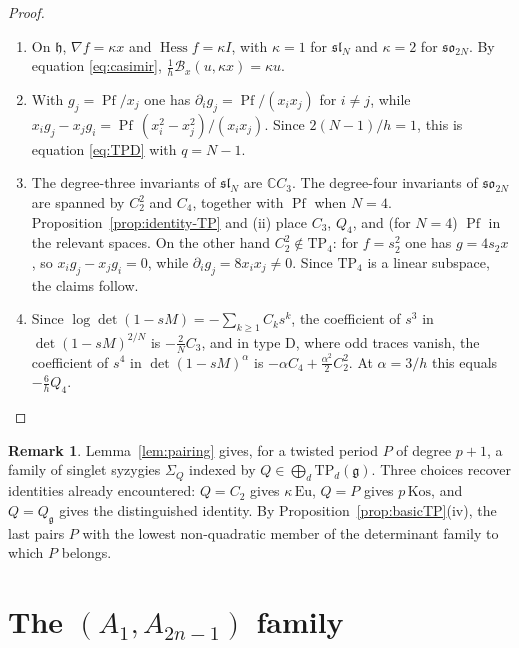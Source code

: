 \documentclass[10pt,reqno]{amsart}
\numberwithin{equation}{section}
\theoremstyle{plain}
\theoremstyle{definition}
\newtheorem{remark}[theorem]{Remark}
\DeclareMathOperator{\Pf}{Pf}
\DeclareMathOperator{\Hess}{Hess}
\newcommand{\Eu}{\mathrm{Eu}}
\newcommand{\Kos}{\mathrm{Kos}}
\newcommand{\TP}{\mathrm{TP}}
\begin{document}
\begin{proof}
\begin{enumerate}[label=(\roman*)]
	\item On $\mathfrak{h}$, $\nabla f=\kappa x$ and $\Hess f=\kappa I$, with $\kappa=1$ for $\mathfrak{sl}_N$ and $\kappa=2$ for $\mathfrak{so}_{2N}$. By equation \eqref{eq:casimir}, $\tfrac1h\mathcal{B}_x(u,\kappa x)=\kappa u$.
	\item With $g_j=\Pf/x_j$ one has $\partial_ig_j=\Pf/(x_ix_j)$ for $i\neq j$, while $x_ig_j-x_jg_i=\Pf\,(x_i^2-x_j^2)/(x_ix_j)$. Since $2(N-1)/h=1$, this is equation \eqref{eq:TPD} with $q=N-1$.
	\item The degree-three invariants of $\mathfrak{sl}_N$ are $\mathbb{C} C_3$. The degree-four invariants of $\mathfrak{so}_{2N}$ are spanned by $C_2^2$ and $C_4$, together with $\Pf$ when $N=4$. Proposition~\ref{prop:identity-TP} and (ii) place $C_3$, $Q_4$, and (for $N=4$) $\Pf$ in the relevant spaces. On the other hand $C_2^2\notin\TP_4$: for $f=s_2^2$ one has $g=4s_2x$, so $x_ig_j-x_jg_i=0$, while $\partial_ig_j=8x_ix_j\neq0$. Since $\TP_4$ is a linear subspace, the claims follow.
	\item Since $\log\det(1-sM)=-\sum_{k\ge1}C_ks^k$, the coefficient of $s^3$ in $\det(1-sM)^{2/N}$ is $-\tfrac2NC_3$, and in type D, where odd traces vanish, the coefficient of $s^4$ in $\det(1-sM)^{\alpha}$ is $-\alpha C_4+\tfrac{\alpha^2}2C_2^2$. At $\alpha=3/h$ this equals $-\tfrac6hQ_4$.
\end{enumerate}
\end{proof}

\begin{remark}\label{rem:tower}
Lemma~\ref{lem:pairing} gives, for a twisted period $P$ of degree $p+1$, a family of singlet syzygies $\Sigma_Q$ indexed by $Q\in\bigoplus_d\TP_d(\mathfrak{g})$. Three choices recover identities already encountered: $Q=C_2$ gives $\kappa\,\Eu$, $Q=P$ gives $p\,\Kos$, and $Q=Q_\mathfrak{g}$ gives the distinguished identity. By Proposition~\ref{prop:basicTP}(iv), the last pairs $P$ with the lowest non-quadratic member of the determinant family to which $P$ belongs.
\end{remark}


\section{The \texorpdfstring{$(A_1,A_{2n-1})$}{(A1,A2n-1)} family}\label{sec:A1}
\end{document}
